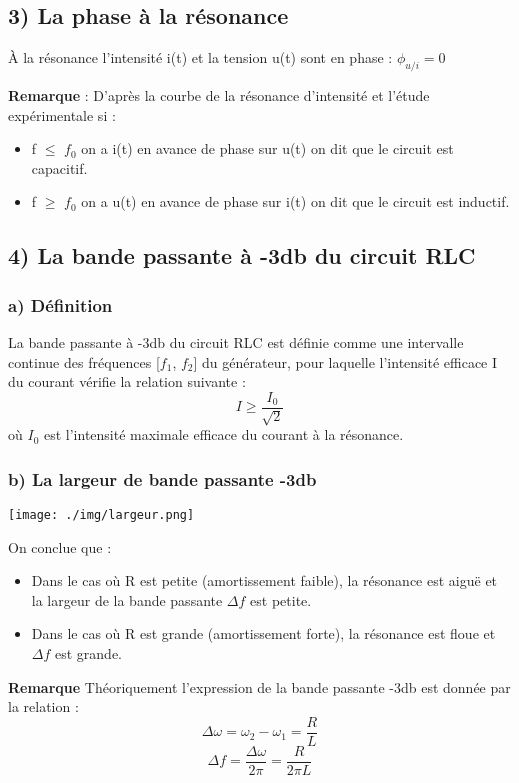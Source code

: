 \documentclass[12pt]{article}
\begin{document}
\subsection*{3) La phase à la résonance}
À la résonance l'intensité i(t) et la tension u(t) sont en phase :
$\phi_{u/i} = 0$

\textbf{Remarque} :
D'après la courbe de la résonance d'intensité et l'étude expérimentale si :
\begin{itemize}
\item f $\leq$ $f_0$ on a i(t) en avance de phase sur u(t) on dit que le circuit est capacitif.
\item f $\geq$ $f_0$ on a u(t) en avance de phase sur i(t) on dit que le circuit est inductif.
\end{itemize}

\subsection*{4) La bande passante à -3db du circuit RLC}
\subsubsection*{a) Définition}
La bande passante à -3db du circuit RLC est définie comme une intervalle continue des fréquences [$f_1$, $f_2$] du générateur, pour laquelle l'intensité efficace I du courant vérifie la relation suivante : 
\[ I \geq \frac{I_0}{\sqrt{2}} \]
où $I_0$ est l'intensité maximale efficace du courant à la résonance.

\subsubsection*{b) La largeur de bande passante -3db}
  \begin{center}
    \texttt{[image: ./img/largeur.png]}
  \end{center}




On conclue que :
\begin{itemize}
\item Dans le cas où R est petite (amortissement faible), la résonance est aiguë et la largeur de la bande passante $\Delta f$ est petite.
\item Dans le cas où R est grande (amortissement forte), la résonance est floue et $\Delta f$ est grande.
\end{itemize}

\textbf{Remarque}
Théoriquement l'expression de la bande passante -3db est donnée par la relation :
\[ \Delta\omega = \omega_2 - \omega_1 = \frac{R}{L} \]
\[ \Delta f = \frac{\Delta\omega}{2\pi} = \frac{R}{2\pi L} \]
\end{document}
